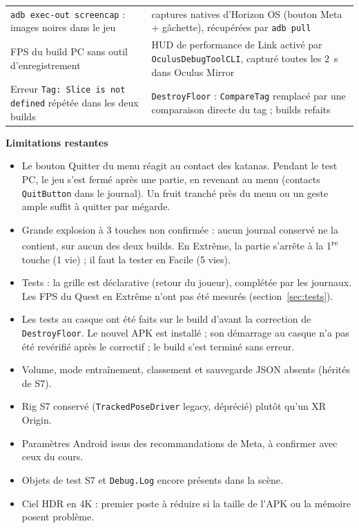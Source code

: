 \documentclass[11pt,a4paper]{article}
\begin{document}
\begin{table}[H]
\begin{tabularx}{\textwidth}{@{}P{4.2cm}L@{}}
\texttt{adb exec-out screencap} : images noires dans le jeu & captures natives d'Horizon OS (bouton Meta + gâchette), récupérées par \texttt{adb pull} \\
FPS du build PC sans outil d'enregistrement & HUD de performance de Link activé par \texttt{OculusDebugToolCLI}, capturé toutes les 2~s dans Oculus Mirror \\
Erreur \texttt{Tag: Slice is not defined} répétée dans les deux builds & \texttt{DestroyFloor} : \texttt{CompareTag} remplacé par une comparaison directe du tag ; builds refaits \\
\bottomrule
\end{tabularx}
\end{table}

\textbf{Limitations restantes}
\begin{itemize}
\item Le bouton Quitter du menu réagit au contact des katanas. Pendant le test PC, le jeu s'est fermé
  après une partie, en revenant au menu (contacts \texttt{QuitButton} dans le journal). Un fruit tranché
  près du menu ou un geste ample suffit à quitter par mégarde.
\item Grande explosion à 3 touches non confirmée : aucun journal conservé ne la contient, sur aucun
  des deux builds. En Extrême, la partie s'arrête à la 1\textsuperscript{re} touche (1 vie) ; il faut
  la tester en Facile (5 vies).
\item Tests : la grille est déclarative (retour du joueur), complétée par les journaux. Les FPS du
  Quest en Extrême n'ont pas été mesurés (section~\ref{sec:tests}).
\item Les tests au casque ont été faits sur le build d'avant la correction de \texttt{DestroyFloor}.
  Le nouvel APK est installé ; son démarrage au casque n'a pas été revérifié après le correctif ;
  le build s'est terminé sans erreur.
\item Volume, mode entraînement, classement et sauvegarde JSON absents (hérités de S7).
\item Rig S7 conservé (\texttt{TrackedPoseDriver} legacy, déprécié) plutôt qu'un XR Origin.
\item Paramètres Android issus des recommandations de Meta, à confirmer avec ceux du cours.
\item Objets de test S7 et \texttt{Debug.Log} encore présents dans la scène.
\item Ciel HDR en 4K : premier poste à réduire si la taille de l'APK ou la mémoire posent problème.
\end{itemize}
\end{document}
